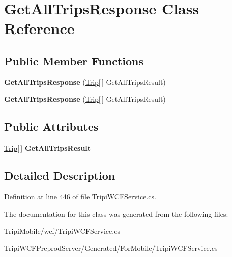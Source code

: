 \hypertarget{class_get_all_trips_response}{
\section{GetAllTripsResponse Class Reference}
\label{class_get_all_trips_response}
}
\subsection*{Public Member Functions}
\begin{DoxyCompactItemize}
\item 
\hypertarget{class_get_all_trips_response_a0b7076eb19bcfe8cee2734d3957cd7be}{
{\bfseries GetAllTripsResponse} (\hyperlink{class_trip}{Trip}\mbox{[}$\,$\mbox{]} GetAllTripsResult)}
\label{class_get_all_trips_response_a0b7076eb19bcfe8cee2734d3957cd7be}

\item 
\hypertarget{class_get_all_trips_response_a0b7076eb19bcfe8cee2734d3957cd7be}{
{\bfseries GetAllTripsResponse} (\hyperlink{class_trip}{Trip}\mbox{[}$\,$\mbox{]} GetAllTripsResult)}
\label{class_get_all_trips_response_a0b7076eb19bcfe8cee2734d3957cd7be}

\end{DoxyCompactItemize}
\subsection*{Public Attributes}
\begin{DoxyCompactItemize}
\item 
\hypertarget{class_get_all_trips_response_aebfbd4d1a7b4736c690a0e2aad3197b6}{
\hyperlink{class_trip}{Trip}\mbox{[}$\,$\mbox{]} {\bfseries GetAllTripsResult}}
\label{class_get_all_trips_response_aebfbd4d1a7b4736c690a0e2aad3197b6}

\end{DoxyCompactItemize}


\subsection{Detailed Description}


Definition at line 446 of file TripiWCFService.cs.

The documentation for this class was generated from the following files:\begin{DoxyCompactItemize}
\item 
TripiMobile/wcf/TripiWCFService.cs\item 
TripiWCFPreprodServer/Generated/ForMobile/TripiWCFService.cs\end{DoxyCompactItemize}
